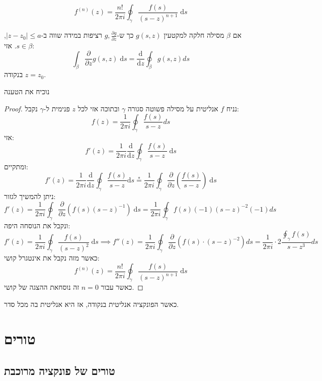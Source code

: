\documentclass{tstextbook}
\begin{document}
\begin{proposition}
$$f^{(n)}(z)=\frac{n!}{2\pi i} \oint_{\gamma} \frac{f(s)}{(s-z)^{n+1}}\;\mathrm{d}s$$

\end{proposition}
\begin{lemma}
אם \(\beta\) מסילה חלקה למקטעין \(g(s,z)\) כך ש-\(g,\frac{\partial g}{\partial z}\) רציפות במידה שווה ב-\(\lvert z-z_{0} \rvert\leq a\), \(s \in \beta\). אזי:
$$\int_{\beta} \frac{\partial }{\partial z} g(s,z)\;\mathrm{d}s = \frac{\mathrm{d} }{\mathrm{d} z} \oint_{\beta}g(s,z)ds$$
בנקודה \(z=z_{0}\).

\end{lemma}
נוכיח את הטענה

\begin{proof}
נניח \(f\) אנליטית על מסילה פשוטה סגורה \(\gamma\) ובתוכה אזי לכל \(z\) פנימית ל-\(\gamma\) נקבל:
$$f(z)=\frac{1}{2\pi i}\oint_{\gamma} \frac{f(s)}{s-z}ds$$
אזי:
$$f'(z)=\frac{1}{2\pi i} \frac{\mathrm{d} }{\mathrm{d} z} \oint_{\gamma} \frac{f(s)}{s-z}\;\mathrm{d}s$$
ומתקיים:
$$f'(z)=\frac{1}{2\pi i}\frac{\mathrm{d} }{\mathrm{d} z} \oint_{\gamma}\frac{f(s)}{s-z}\mathrm{d}s\overset{*}{=} \frac{1}{2\pi i}\oint_{\gamma}\frac{\partial }{\partial z} \left( \frac{f(s)}{s-z} \right)\;\mathrm{d}s$$
ניתן להמשיך לגזור:
$$f'(z)=\frac{1}{2\pi i}\oint_{\gamma} \frac{\partial }{\partial z} (f(s)(s-z)^{-1})\;\mathrm{d}s = \frac{1}{2\pi i} \oint_{\gamma}f(s) (-1)(s-z)^{-2}(-1)ds$$
ונקבל את הנוסחה היפה:
$$f'(z)=\frac{1}{2\pi i}\oint_{\gamma} \frac{f(s)}{(s-z)^2}\;\mathrm{d}s \implies f''(z)=\frac{1}{2\pi i}\oint_{\gamma} \frac{\partial }{\partial z} \left( f(s)\cdot(s-z)^{-2} \right)ds=\frac{1}{2\pi i}\cdot 2 \frac{\oint_{\gamma}f(s)}{s-z^3}ds$$
כאשר מזה נקבל את אינטגרל קושי:
$$\boxed{f^{(n)}(z)=\frac{n!}{2\pi i} \oint_{\gamma} \frac{f(s)}{(s-z)^{n+1}}\;\mathrm{d}s}
$$
כאשר עבור \(n=0\) זה נוסחאת ההצגה של קושי.

\end{proof}
\begin{corollary}
כאשר הפונקציה אנליטית בנקודה, אז היא אנליטית בה מכל סדר.

\end{corollary}
\chapter{טורים}

\section{טורים של פונקציה מרוכבת}
\end{document}
